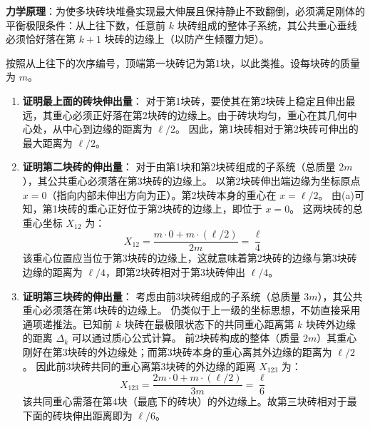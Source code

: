 \begin{solution}
\textbf{力学原理}：为使多块砖块堆叠实现最大伸展且保持静止不致翻倒，必须满足刚体的平衡极限条件：从上往下数，任意前 $k$ 块砖组成的整体子系统，其公共重心垂线必须恰好落在第 $k+1$ 块砖的边缘上（以防产生倾覆力矩）。

按照从上往下的次序编号，顶端第一块砖记为第1块，以此类推。设每块砖的质量为 $m$。
\begin{enumerate}
    \item[(a)] \textbf{证明最上面的砖块伸出量}：
    对于第1块砖，要使其在第2块砖上稳定且伸出最远，其重心必须正好落在第2块砖的边缘上。由于砖块均匀，重心在其几何中心处，从中心到边缘的距离为 $\ell/2$。
    因此，第1块砖相对于第2块砖可伸出的最大距离为 $\ell/2$。

    \item[(b)] \textbf{证明第二块砖的伸出量}：
    对于由第1块和第2块砖组成的子系统（总质量 $2m$），其公共重心必须落在第3块砖的边缘上。
    以第2块砖伸出端边缘为坐标原点 $x=0$（指向内部未伸出方向为正）。第2块砖本身的重心在 $x = \ell/2$。
    由(a)可知，第1块砖的重心正好位于第2块砖的边缘上，即位于 $x = 0$。
    这两块砖的总重心坐标 $X_{12}$ 为：
    $$ X_{12} = \frac{m \cdot 0 + m \cdot (\ell/2)}{2m} = \frac{\ell}{4} $$
    该重心位置应当位于第3块砖的边缘上，这就意味着第2块砖的边缘与第3块砖边缘的距离为 $\ell/4$，即第2块砖相对于第3块砖伸出 $\ell/4$。

    \item[(c)] \textbf{证明第三块砖的伸出量}：
    考虑由前3块砖组成的子系统（总质量 $3m$），其公共重心必须落在第4块砖的边缘上。
    仍类似于上一级的坐标思想，不妨直接采用通项递推法。已知前 $k$ 块砖在最极限状态下的共同重心距离第 $k$ 块砖外边缘的距离 $\Delta_k$ 可以通过质心公式计算。
    前2块砖构成的整体（质量 $2m$）其重心刚好在第3块砖的外边缘处；而第3块砖本身的重心离其外边缘的距离为 $\ell/2$。
    因此前3块砖共同的重心离第3块砖的外边缘的距离 $X_{123}$ 为：
    $$ X_{123} = \frac{2m \cdot 0 + m \cdot (\ell/2)}{3m} = \frac{\ell}{6} $$
    该共同重心需落在第4块（最底下的砖块）的外边缘上。故第三块砖相对于最下面的砖块伸出距离即为 $\ell/6$。
\end{enumerate}
\end{solution}

